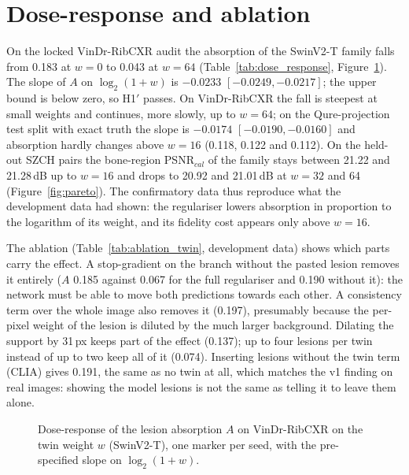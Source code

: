 \section{Dose-response and ablation}
\label{sec:res_twin}
On the locked VinDr-RibCXR audit the absorption of the SwinV2-T family falls from 0.183 at $w=0$ to 0.043 at $w=64$
(Table~\ref{tab:dose_response}, Figure~\ref{fig:dose_response}). The slope of $A$ on $\log_2(1+w)$ is $-0.0233$ $[-0.0249,-0.0217]$; the
upper bound is below zero, so H1$'$ passes. On VinDr-RibCXR the fall is steepest at small weights and continues, more slowly, up to $w=64$; on
the Qure-projection test split with exact truth the slope is $-0.0174$ $[-0.0190,-0.0160]$ and absorption hardly changes above $w=16$ (0.118, 0.122 and 0.112). On the
held-out SZCH pairs the bone-region PSNR$_{cal}$ of the family stays between 21.22 and 21.28\,dB up to $w=16$ and drops to 20.92 and 21.01\,dB
at $w=32$ and 64 (Figure~\ref{fig:pareto}). The confirmatory data thus reproduce what the development data had shown: the regulariser lowers
absorption in proportion to the logarithm of its weight, and its fidelity cost appears only above $w=16$.

The ablation (Table~\ref{tab:ablation_twin}, development data) shows which parts carry the effect. A stop-gradient on the branch without the
pasted lesion removes it entirely ($A$ 0.185 against 0.067 for the full regulariser and 0.190 without it): the network must be able to move both
predictions towards each other. A consistency term over the whole image also removes it (0.197), presumably because the per-pixel weight of
the lesion is diluted by the much larger background. Dilating the support by 31\,px keeps part of the effect (0.137); up to four lesions per
twin instead of up to two keep all of it (0.074). Inserting lesions without the twin term (CLIA) gives 0.191, the same as no twin at all,
which matches the v1 finding on real images: showing the model lesions is not the same as telling it to leave them alone.
\begin{table}[htbp]
\centering\small
\caption{Dose-response of the lesion absorption on the twin weight (SwinV2-T family): seeds per weight, mean $A$ on VinDr-RibCXR and on the
Qure-projection test split, and the pre-specified slope with its image-cluster bootstrap interval.}
\label{tab:dose_response}
\end{table}
\begin{figure}[htbp]
\centering
{}
\caption{Dose-response of the lesion absorption $A$ on VinDr-RibCXR on the twin weight $w$ (SwinV2-T), one marker per seed, with the
pre-specified slope on $\log_2(1+w)$.}
\label{fig:dose_response}
\end{figure}
\begin{table}[htbp]
\centering\small
\caption{Ablation of the twin regulariser at $w=16$ (SwinV2-T, 300k samples, mean over seeds): one factor changed per row. Development evidence:
audit on all 75 SZCH images, bone PSNR$_{cal}$ on the 24 development pairs.}
\label{tab:ablation_twin}
\end{table}


